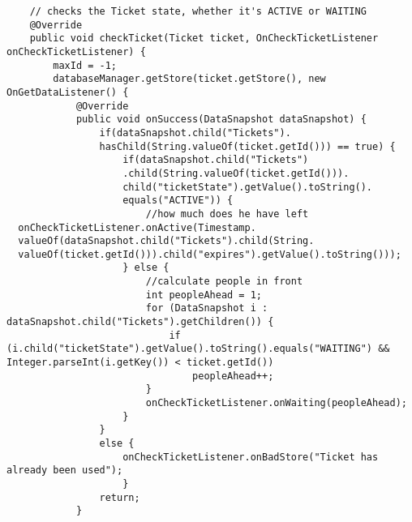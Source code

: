 \begin{lstlisting}
    // checks the Ticket state, whether it's ACTIVE or WAITING
    @Override
    public void checkTicket(Ticket ticket, OnCheckTicketListener onCheckTicketListener) {
        maxId = -1;
        databaseManager.getStore(ticket.getStore(), new OnGetDataListener() {
            @Override
            public void onSuccess(DataSnapshot dataSnapshot) {
                if(dataSnapshot.child("Tickets").
                hasChild(String.valueOf(ticket.getId())) == true) {
                    if(dataSnapshot.child("Tickets")
                    .child(String.valueOf(ticket.getId())).
                    child("ticketState").getValue().toString().
                    equals("ACTIVE")) {
                        //how much does he have left
  onCheckTicketListener.onActive(Timestamp.
  valueOf(dataSnapshot.child("Tickets").child(String.
  valueOf(ticket.getId())).child("expires").getValue().toString()));
                    } else {
                        //calculate people in front
                        int peopleAhead = 1;
                        for (DataSnapshot i : dataSnapshot.child("Tickets").getChildren()) {
                            if
(i.child("ticketState").getValue().toString().equals("WAITING") && Integer.parseInt(i.getKey()) < ticket.getId())
                                peopleAhead++;
                        }
                        onCheckTicketListener.onWaiting(peopleAhead);
                    }
                }
                else {
                    onCheckTicketListener.onBadStore("Ticket has already been used");
                    }
                return;
            }


\end{lstlisting}
